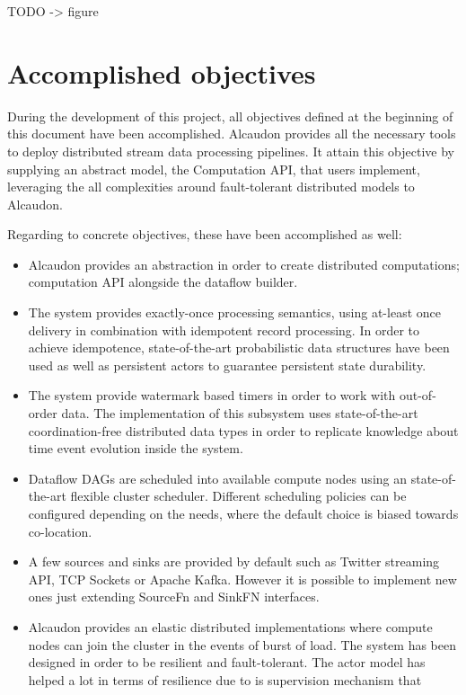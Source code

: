 TODO -> figure

\section{Accomplished objectives}

During the development of this project, all objectives defined at the beginning
of this document have been accomplished. Alcaudon provides all the necessary
tools to deploy distributed stream data processing pipelines. It attain this
objective by supplying an abstract model, the Computation \acs{API}, that users
implement, leveraging the all complexities around fault-tolerant distributed
models to Alcaudon.

Regarding to concrete objectives, these have been accomplished as well:

\begin{itemize}
\item Alcaudon provides an abstraction in order to create distributed
  computations; computation \acs{API} alongside the dataflow builder.
\item The system provides exactly-once processing semantics, using at-least once
  delivery in combination with idempotent record processing. In order to achieve
  idempotence, state-of-the-art probabilistic data structures have been used as
  well as persistent actors to guarantee persistent state durability.
\item The system provide watermark based timers in order to work with
  out-of-order data. The implementation of this subsystem uses state-of-the-art
  coordination-free distributed data types in order to replicate knowledge about
  time event evolution inside the system.
\item Dataflow \acs{DAG}s are scheduled into available compute nodes using an
  state-of-the-art flexible cluster scheduler\cite{firmament}. Different scheduling
  policies can be configured depending on the needs, where the default choice is
  biased towards co-location.
\item A few sources and sinks are provided by default such as Twitter streaming
  API, TCP Sockets or Apache Kafka. However it is possible to implement new ones
  just extending SourceFn and SinkFN interfaces.
\item Alcaudon provides an elastic distributed implementations where compute
  nodes can join the cluster in the events of burst of load. The system has been
  designed in order to be resilient and fault-tolerant. The actor model has
  helped a lot in terms of resilience due to is supervision mechanism that

\end{itemize}
